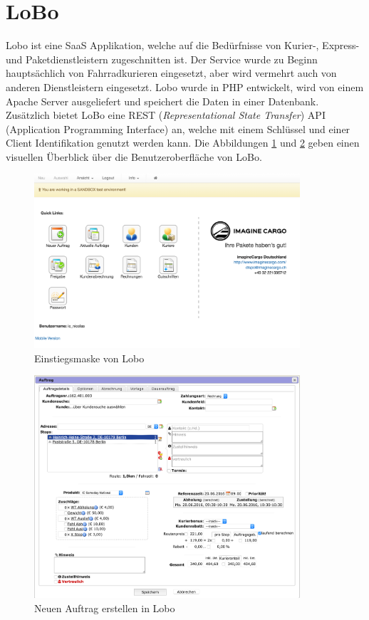\section{LoBo}
Lobo ist eine SaaS Applikation, welche auf die Bedürfnisse von Kurier-, Express- und Paketdienstleistern zugeschnitten ist. Der Service wurde zu Beginn hauptsächlich von Fahrradkurieren eingesetzt, aber wird vermehrt auch von anderen Dienstleistern eingesetzt. Lobo wurde in PHP entwickelt, wird von einem Apache Server ausgeliefert und speichert die Daten in einer Datenbank. Zusätzlich bietet LoBo eine REST (\textit{Representational State Transfer}) API (Application Programming Interface) an, welche mit einem Schlüssel und einer Client Identifikation genutzt werden kann. Die Abbildungen \ref{fig1:lobooverview} und \ref{fig1:lobonewtask} geben einen visuellen Überblick über die Benutzeroberfläche von LoBo.
\begin{figure}[ht]
	\centering
  \includegraphics[width=0.88\textwidth]{images/loboOverview.png}
	\caption{Einstiegsmaske von Lobo}
	\label{fig1:lobooverview}
\end{figure}
\begin{figure}[ht]
	\centering
  \includegraphics[width=0.88\textwidth]{images/loboNewtask.png}
	\caption{Neuen Auftrag erstellen in Lobo}
	\label{fig1:lobonewtask}
\end{figure}
